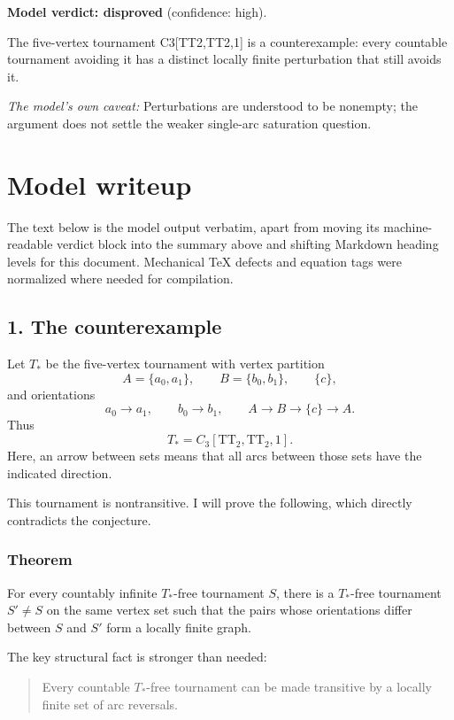 \documentclass[
  11pt,
  a4paper,
]{article}
\newcounter{none} %
\begin{document}
\textbf{Model verdict: disproved} (confidence: high).

The five-vertex tournament C3{[}TT2,TT2,1{]} is a counterexample: every
countable tournament avoiding it has a distinct locally finite
perturbation that still avoids it.

\emph{The model's own caveat:} Perturbations are understood to be
nonempty; the argument does not settle the weaker single-arc saturation
question.

\section{Model writeup}\label{model-writeup}

The text below is the model output verbatim, apart from moving its
machine-readable verdict block into the summary above and shifting
Markdown heading levels for this document. Mechanical TeX defects and
equation tags were normalized where needed for compilation.

\subsection{1. The counterexample}\label{the-counterexample}

Let \(T_\ast\) be the five-vertex tournament with vertex partition \[
A=\{a_0,a_1\},\qquad B=\{b_0,b_1\},\qquad \{c\},
\] and orientations \[
a_0\to a_1,\qquad b_0\to b_1,\qquad
A\to B\to \{c\}\to A.
\] Thus \[
T_\ast=C_3[\mathrm{TT}_2,\mathrm{TT}_2,1].
\] Here, an arrow between sets means that all arcs between those sets
have the indicated direction.

This tournament is nontransitive. I will prove the following, which
directly contradicts the conjecture.

\subsubsection{Theorem}\label{theorem}

For every countably infinite \(T_\ast\)-free tournament \(S\), there is
a \(T_\ast\)-free tournament \(S'\ne S\) on the same vertex set such
that the pairs whose orientations differ between \(S\) and \(S'\) form a
locally finite graph.

The key structural fact is stronger than needed:

\begin{quote}
Every countable \(T_\ast\)-free tournament can be made transitive by a
locally finite set of arc reversals.
\end{quote}
\end{document}
